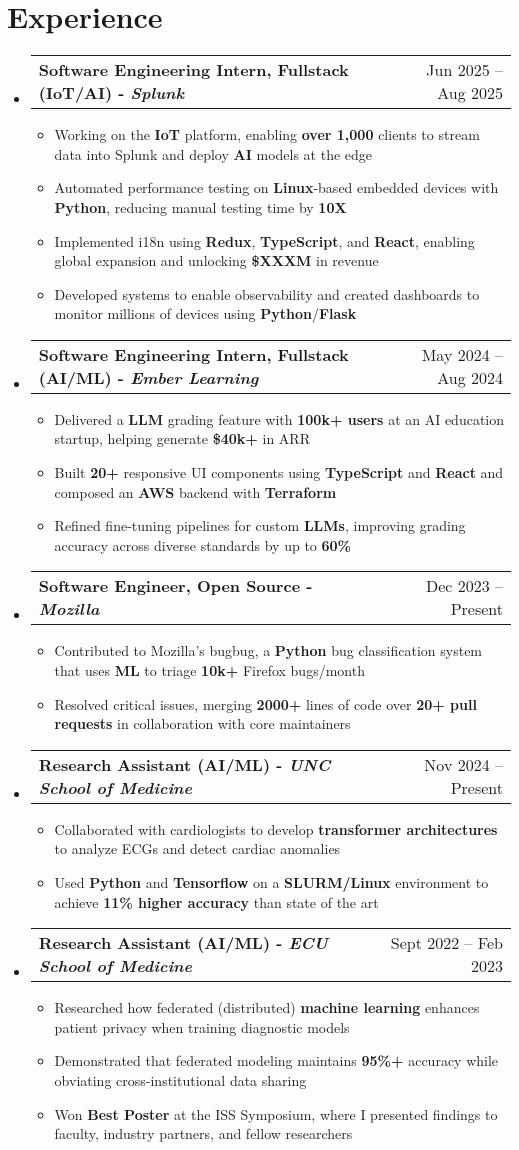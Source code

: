 \documentclass[letterpaper,11pt]{article}
\makeatletter
\newcommand{\resumeItem}[1]{
  \item\small{
    {#1 \vspace{-2pt}}}
}
\newcommand{\resumeSubheading}[2]{
  \vspace{-2pt}\item
    \begin{tabular*}{0.97\textwidth}[t]{l@{\extracolsep{\fill}}r}
      \textbf{#1} & #2 \\
    \end{tabular*}
    \vspace{-7pt}
}
\newcommand{\resumeSubHeadingListStart}{\begin{itemize}[leftmargin=0.15in, label={}]}
\newcommand{\resumeSubHeadingListEnd}{\end{itemize}}
\newcommand{\resumeItemListStart}{\begin{itemize}[leftmargin=0.15in]}
\newcommand{\resumeItemListEnd}{\end{itemize}\vspace{-5pt}}
\makeatother
\begin{document}
\section{Experience}
  \resumeSubHeadingListStart
  \resumeSubheading
  {\textbf{ Software Engineering Intern, Fullstack (IoT/AI)} - \textit{Splunk}}{Jun 2025 -- Aug 2025}
  \resumeItemListStart
    \resumeItem{Working on the \textbf{IoT} platform, enabling \textbf{over 1,000} clients to stream data into Splunk and deploy \textbf{AI} models at the edge}
    \resumeItem{Automated performance testing on \textbf{Linux}-based embedded devices with \textbf{Python}, reducing manual testing time by \textbf{10X}}
    \resumeItem{Implemented i18n using \textbf{Redux}, \textbf{TypeScript}, and \textbf{React}, enabling global expansion and unlocking \textbf{\$XXXM} in revenue}
    \resumeItem{Developed systems to enable observability and created dashboards to monitor millions of devices using \textbf{Python}/\textbf{Flask}}
  \resumeItemListEnd
  \resumeSubheading
      {\textbf{Software Engineering Intern, Fullstack (AI/ML)} - \textit{Ember Learning}}{May 2024 -- Aug 2024}
      \resumeItemListStart
        \resumeItem{Delivered a \textbf{LLM} grading feature with \textbf{100k+ users} at an AI education startup, helping generate \textbf{\$40k+} in ARR}
        \resumeItem{Built \textbf{20+} responsive UI components using \textbf{TypeScript} and \textbf{React} and composed an \textbf{AWS} backend with \textbf{Terraform}}
        \resumeItem{Refined fine-tuning pipelines for custom \textbf{LLMs}, improving grading accuracy across diverse standards by up to \textbf{60\%}}
      \resumeItemListEnd
      \resumeSubheading
      {\textbf{Software Engineer, Open Source} - \textit{Mozilla}}{Dec 2023 -- Present}
      \resumeItemListStart
        \resumeItem{Contributed to Mozilla's bugbug, a \textbf{Python} bug classification system that uses \textbf{ML} to triage \textbf{10k+} Firefox bugs/month} 
        \resumeItem{Resolved critical issues, merging \textbf{2000+} lines of code over \textbf{20+ pull requests} in collaboration with core maintainers}
      \resumeItemListEnd
      \resumeSubheading
      {\textbf{Research Assistant (AI/ML)} - \textit{UNC School of Medicine}}{ Nov 2024 -- Present}
      \resumeItemListStart
        \resumeItem{Collaborated with cardiologists to develop \textbf{transformer architectures} to analyze ECGs and detect cardiac anomalies}
        \resumeItem{Used \textbf{Python} and \textbf{Tensorflow} on a \textbf{SLURM/Linux} environment to achieve \textbf{11\% higher accuracy} than state of the art}
      \resumeItemListEnd
      \resumeSubheading
      {\textbf{Research Assistant (AI/ML)} - \textit{ECU School of Medicine}}{Sept 2022 -- Feb 2023}
      \resumeItemListStart
        \resumeItem{Researched how federated (distributed) \textbf{machine learning} enhances patient privacy when training diagnostic models}
        \resumeItem{Demonstrated that federated modeling maintains \textbf{95\%+} accuracy while obviating cross-institutional data sharing}
        \resumeItem{Won \textbf{Best Poster} at the ISS Symposium, where I presented findings to faculty, industry partners, and fellow researchers}
      \resumeItemListEnd
  \resumeSubHeadingListEnd
\end{document}
